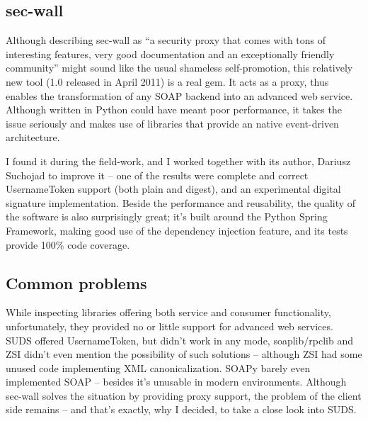 \subsection{sec-wall}

Although \cite{sec-wall-homepage} describing sec-wall as ``a security proxy that comes with tons of interesting features, very good documentation and an exceptionally friendly community'' might sound like the usual shameless self-promotion, this relatively new tool (1.0 released in April 2011) is a real gem. It acts as a proxy, thus enables the transformation of any SOAP backend into an advanced web service. Although written in Python could have meant poor performance, it takes the issue seriously and makes use of libraries that provide an native event-driven architecture.

I found it during the field-work, and I worked together with its author, Dariusz Suchojad to improve it -- one of the results were complete and correct UsernameToken support (both plain and digest), and an experimental digital signature implementation. Beside the performance and reusability, the quality of the software is also surprisingly great; it's built around the Python Spring Framework, making good use of the dependency injection feature, and its tests provide 100\% code coverage.

\subsection{Common problems}

While inspecting libraries offering both service and consumer functionality, unfortunately, they provided no or little support for advanced web services. SUDS offered UsernameToken, but didn't work in any mode, soaplib/rpclib and ZSI didn't even mention the possibility of such solutions -- although ZSI had some unused code implementing XML canonicalization. SOAPy barely even implemented SOAP -- besides it's unusable in modern environments. Although sec-wall solves the situation by providing proxy support, the problem of the client side remains -- and that's exactly, why I decided, to take a close look into SUDS.
